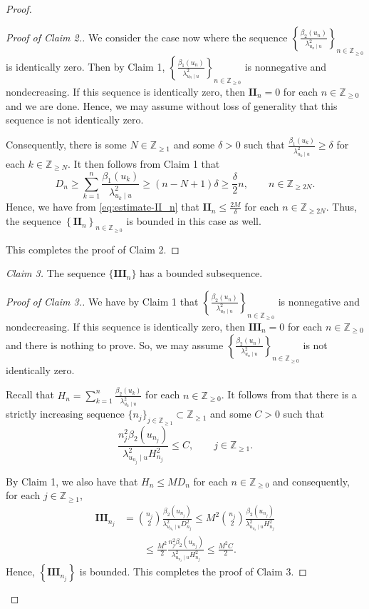 \documentclass[11pt, reqno, a4paper]{amsart}
\theoremstyle{definition}
\renewcommand{\le}{\leqslant}
\renewcommand{\ge}{\geqslant}
\renewcommand{\leq}{\leqslant}
\newcommand{\Z}{\mathbb Z}
\numberwithin{equation}{section}
\begin{document}
\begin{proof}
\begin{proof}[Proof of Claim 2.]
    We consider the case now where the sequence $\left\{ \frac{\beta_2 (u_n)}{\lambda_{u_n \mid u} ^2} \right\}_{n \in \Z_{\ge 0}}$ is identically zero. Then by Claim 1, $\left\{ \frac{\beta_1 (u_n)}{\lambda_{u_n \mid u} ^2} \right\}_{n \in \Z_{\ge 0}}$ is nonnegative and nondecreasing. If this sequence is identically zero, then $\mathbf{II}_n = 0$ for each $n \in \Z_{\ge 0}$ and we are done. Hence, we may assume without loss of generality that this sequence is not identically zero.

    Consequently,  there is some $N \in \Z_{\ge 1}$ and some $\delta> 0$ such that $\frac{\beta_1 (u_k)}{\lambda_{u_k \mid u}^2} \ge \delta$ for each $k \in \Z_{\ge N}$. It then follows from Claim 1 that 
    \begin{equation*}
        D_n \ge \sum_{k=1}^{n} \frac{\beta_1 (u_k)}{\lambda_{u_k \mid u}^2} \ge (n -N +1)\delta \ge \frac{\delta}{2} n, \qquad n \in \Z_{\ge 2N}.
    \end{equation*}
    Hence, we have from \eqref{eq:estimate-II_n} that $\mathbf{II}_n \le \frac{2M}{\delta}$ for each $n \in \Z_{\ge 2N}$. Thus,  the sequence $\left\{ \mathbf{II}_n \right\}_{n \in \Z_{\ge 0}}$ is bounded in this case as well.

    This completes the proof of Claim 2.
\end{proof}

\textit{Claim 3.} The sequence $\{ \mathbf{III}_n \}$ has a bounded subsequence.
\begin{proof}[Proof of Claim 3.]
    We have by Claim 1 that $\left\{ \frac{\beta_2 (u_n)}{\lambda_{u_n \mid u}^2} \right\}_{n \in \Z_{\ge 0}}$ is nonnegative and nondecreasing. If this sequence is identically zero, then $\mathbf{III}_n = 0$ for each $n \in \Z_{\ge 0}$ and there is nothing to prove. So, we may assume $\left\{ \frac{\beta_2 (u_n)}{\lambda_{u_n \mid u}^2} \right\}_{n \in \Z_{\ge 0}}$ is not identically zero.

    Recall that $H_n = \sum_{k=1}^{n} \frac{\beta_2 (u_k)}{\lambda_{u_k \mid u}^2}$ for each $n \in \Z_{\ge 0}$. It follows from  that there is a strictly increasing sequence $\{n_j\}_{j\in\Z_{\ge1}} \subset \Z_{\ge 1}$ and some $C > 0$ such that
    \begin{equation*}
        \frac{n_j ^2 \beta_{2} (u_{n_j})}{\lambda_{u_{n_j} \mid u }^2 H_{n_j}^2} \le C, \qquad j \in \Z_{\ge 1}.
    \end{equation*}

    By Claim 1, we also have that $H_n \le M D_n$ for each $n \in \Z_{\ge 0}$ and consequently, for each $j \in \Z_{\ge 1}$,
    \begin{align*}
        \mathbf{III}_{n_j} &= \binom{n_j}{2}\frac{\beta_2(u_{n_j})}{\lambda_{u_{n_j}\mid u}^2D_{n_j}^2} \leq M^2\binom{n_j}{2}\frac{\beta_2(u_{n_j})}{\lambda_{u_{n_j}\mid u}^2H_{n_j}^2} \\
        &\qquad \le \frac{M^2}{2}\frac{n_j^2\beta_2(u_{n_j})}{\lambda_{u_{n_j}\mid u}^2H_{n_j}^2} \leq \frac{M^2C}{2}.
    \end{align*}
    Hence, $\left\{ \mathbf{III}_{n_j} \right\}$ is bounded. This completes the proof of Claim 3.
\end{proof}


\end{proof}
\end{document}

